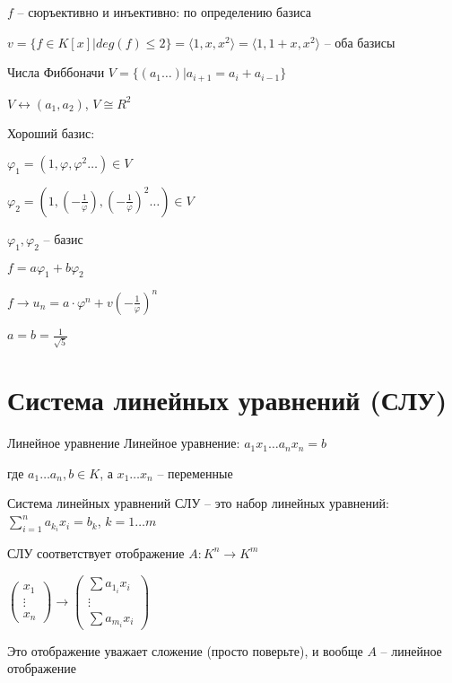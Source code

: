 \documentclass[12pt]{article}
\newcommand{\q}[1]{\langle #1 \rangle}
\begin{document}
$f$ -- сюръективно и инъективно: по определению базиса

\begin{Example}{}
    $v = \{ f \in K[x] | deg(f) \leq 2 \} = \q{1, x, x^2} = \q{1, 1 + x, x^2}$ -- оба базисы
\end{Example}

\begin{Example}{Числа Фиббоначи}
    $V = \{ (a_1 \ldots) | a_{i + 1} = a_i + a_{i - 1} \}$

    $V \leftrightarrow (a_1, a_2)$, $V \cong R^2$

    Хороший базис:

    $\varphi_1 = (1, \varphi, \varphi^2 \ldots) \in V$

    $\varphi_2 = (1, (-\frac{1}{\varphi}), (-\frac{1}{\varphi})^2 \ldots) \in V$

    $\varphi_1, \varphi_2$ -- базис

    $f = a\varphi_1 + b\varphi_2$

    $f \rightarrow u_n = a \cdot \varphi^n + v(-\frac{1}{\varphi})^n$

    $a = b = \frac{1}{\sqrt{5}}$
\end{Example}

\section{Система линейных уравнений (СЛУ)}

\begin{defin}{Линейное уравнение}
    Линейное уравнение: $a_1x_1 \ldots a_nx_n = b$
    
    где $a_1 \ldots a_n, b \in K$, а $x_1 \ldots x_n$ -- переменные
\end{defin}

\begin{defin}{Система линейных уравнений}
    СЛУ -- это набор линейных уравнений: $\sum\limits_{i = 1}^n a_{k_i}x_i = b_k$, $k = 1 \ldots m$

    СЛУ соответствует отображение $A: K^n \rightarrow K^m$

    $\left( \begin{gathered}
        x_1 \\
        \vdots \\
        x_n
    \end{gathered} \right) \rightarrow \left( \begin{gathered}
        \sum a_{1_i}x_i \\
        \vdots \\
        \sum a_{m_i}x_i
    \end{gathered} \right)$

    Это отображение уважает сложение (просто поверьте), и вообще $A$ -- линейное отображение
\end{defin}
\end{document}
